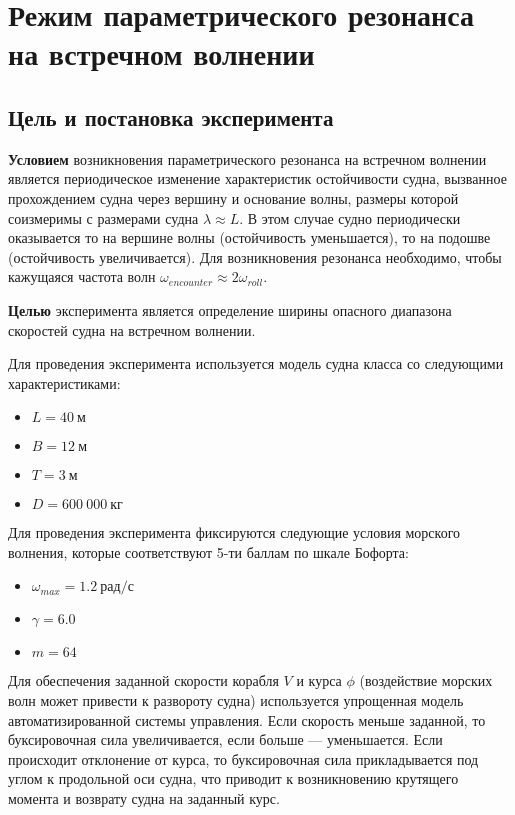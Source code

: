 \section{Режим параметрического резонанса на встречном волнении}

\subsection{Цель и постановка эксперимента}

\textbf{Условием} возникновения параметрического резонанса на встречном волнении является периодическое изменение характеристик остойчивости судна, вызванное прохождением судна через вершину и основание волны, размеры которой соизмеримы с размерами судна $\lambda \approx L$. В этом случае судно периодически оказывается то на вершине волны (остойчивость уменьшается), то на подошве (остойчивость увеличивается). Для возникновения резонанса необходимо, чтобы кажущаяся частота волн $\omega_{encounter} \approx 2\omega_{roll}$.

\textbf{Целью} эксперимента является определение ширины опасного диапазона скоростей судна на встречном волнении.

Для проведения эксперимента используется модель судна класса  со следующими характеристиками:
\begin{itemize}
	\item	$L = 40\ \text{м}$
	\item	$B = 12\ \text{м}$
	\item	$T = 3\ \text{м}$
	\item	$D = 600\ 000\ \text{кг}$
\end{itemize}

Для проведения эксперимента фиксируются следующие условия морского волнения, которые соответствуют 5-ти баллам по шкале Бофорта:
\begin{itemize}
	\item	$\omega_{max} = 1.2\ \text{рад/с}$
	\item	$\gamma = 6.0$
	\item	$m = 64$
\end{itemize}

Для обеспечения заданной скорости корабля $V$ и курса $\phi$ (воздействие морских волн может привести к развороту судна) используется упрощенная модель автоматизированной системы управления. Если скорость меньше заданной, то буксировочная сила увеличивается, если больше --- уменьшается. Если происходит отклонение от курса, то буксировочная сила прикладывается под углом к продольной оси судна, что приводит к возникновению крутящего момента и возврату судна на заданный курс.

